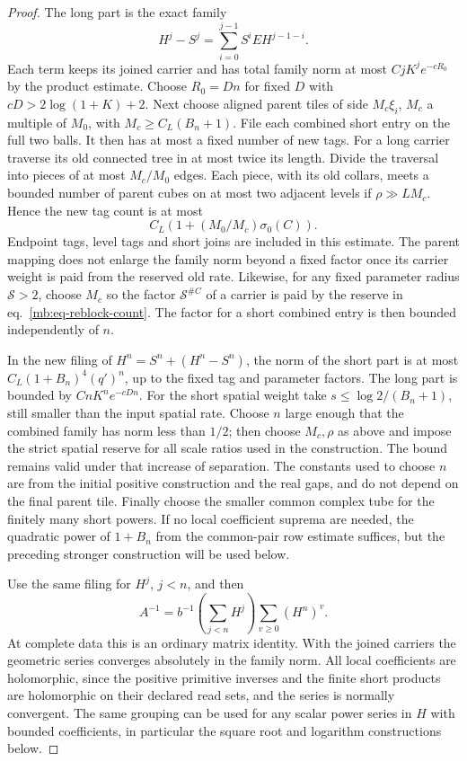 \documentclass[11pt,letterpaper,reqno]{amsart}
\numberwithin{equation}{section}
\renewcommand{\eqref}[1]{\textup{eq.~\ref{#1}}}
\theoremstyle{definition}
\theoremstyle{remark}
\begin{document}
\begin{proof}
The long part is the exact family
\[
 H^j-S^j=\sum_{i=0}^{j-1} S^i E H^{j-1-i}.
\]
Each term keeps its joined carrier and has total family norm at most \(CjK^j e^{-cR_0}\) by the product estimate. Choose \(R_0=D n\) for fixed \(D\) with \(cD>2\log(1+K)+2\). Next choose aligned parent tiles of side \(M_c\xi_i\), \(M_c\) a multiple of \(M_0\), with \(M_c\ge C_L(B_n+1)\). File each combined short entry on the full two balls. It then has at most a fixed number of new tags. For a long carrier traverse its old connected tree in at most twice its length. Divide the traversal into pieces of at most \(M_c/M_0\) edges. Each piece, with its old collars, meets a bounded number of parent cubes on at most two adjacent levels if \(\rho\gg LM_c\). Hence the new tag count is at most
\begin{equation}\label{mb:eq-reblock-count}
                    C_L(1+(M_0/M_c)\sigma_0(C)).
\end{equation}
Endpoint tags, level tags and short joins are included in this estimate. The parent mapping does not enlarge the family norm beyond a fixed factor once its carrier weight is paid from the reserved old rate. Likewise, for any fixed parameter radius \(\mathcal S>2\), choose \(M_c\) so the factor \(\mathcal S^{\# C}\) of a carrier is paid by the reserve in \eqref{mb:eq-reblock-count}. The factor for a short combined entry is then bounded independently of \(n\).

In the new filing of \(H^n=S^n+(H^n-S^n)\), the norm of the short part is at most \(C_L(1+B_n)^4(q')^n\), up to the fixed tag and parameter factors. The long part is bounded by \(CnK^n e^{-cDn}\). For the short spatial weight take \(s\le \log2/(B_n+1)\), still smaller than the input spatial rate. Choose \(n\) large enough that the combined family has norm less than \(1/2\); then choose \(M_c,\rho\) as above and impose the strict spatial reserve for all scale ratios used in the construction. The bound remains valid under that increase of separation. The constants used to choose \(n\) are from the initial positive construction and the real gaps, and do not depend on the final parent tile. Finally choose the smaller common complex tube for the finitely many short powers. If no local coefficient suprema are needed, the quadratic power of \(1+B_n\) from the common-pair row estimate suffices, but the preceding stronger construction will be used below.

Use the same filing for \(H^j\), \(j<n\), and then
\begin{equation}\label{mb:eq-coarse-carrier-inverse}
 A^{-1}=b^{-1}\left(\sum_{j<n}H^j\right)\sum_{v\ge0}(H^n)^v .
\end{equation}
At complete data this is an ordinary matrix identity. With the joined carriers the geometric series converges absolutely in the family norm. All local coefficients are holomorphic, since the positive primitive inverses and the finite short products are holomorphic on their declared read sets, and the series is normally convergent. The same grouping can be used for any scalar power series in \(H\) with bounded coefficients, in particular the square root and logarithm constructions below.
\end{proof}
\end{document}
